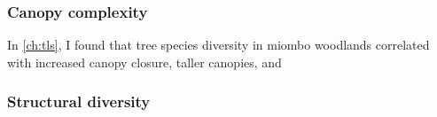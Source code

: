 \begin{refsection}




\subsubsection{Canopy complexity}

In \autoref{ch:tls}, I found that tree species diversity in miombo woodlands correlated with increased canopy closure, taller canopies, and 



\subsubsection{Structural diversity}




\end{refsection}
